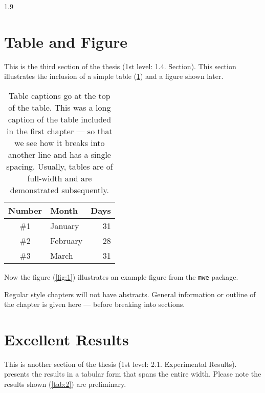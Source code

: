 \documentclass[ms-thesis,12pt,chapterrefs]{ndsu-thesis-2022}
\newcommand\myspacing{1.9} %
\begin{document}
\begin{spacing}{\myspacing}
\section{Table and Figure}
This is the third section of the thesis (1st level: 1.4. Section). This section illustrates the inclusion of a simple table (\cref{tab:1}) and a figure shown later.

\begin{table}[h]
\centering
\caption{Table captions go at the top of the table. This was a long caption of the table included in the first chapter --- so that we see how it breaks into another line and has a single spacing. Usually, tables are of full-width and are demonstrated subsequently.}
\vspace{-1ex}
\begin{tabular}{clr}
\toprule
Number & Month & Days\\
\midrule
\#1 & January    & 31\\
\#2 & February   & 28\\
\#3 & March      & 31\\
\bottomrule
\end{tabular}
\label{tab:1}
\end{table}	\kant[7]

Now the figure (\cref{fig:1}) illustrates an example figure from the \texttt{mwe} package.

\kant[8-9]


Regular style chapters will not have abstracts. General information or outline of the chapter is given here --- before breaking into sections. 

\section{Excellent Results}
This is another section of the thesis (1st level: 2.1. Experimental Results). presents the results in a tabular form that spans the entire width. Please note the results shown (\cref{tab:2}) are preliminary.


\end{spacing}
\end{document}
